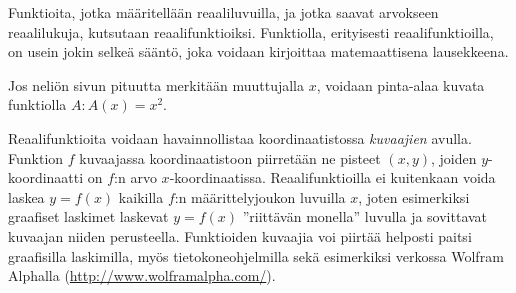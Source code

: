 Funktioita, jotka määritellään reaaliluvuilla, ja jotka saavat arvokseen reaalilukuja, kutsutaan reaalifunktioiksi.
Funktiolla, erityisesti reaalifunktioilla, on usein jokin selkeä sääntö, joka voidaan kirjoittaa matemaattisena lausekkeena.

\begin{esimerkki}
	Jos neliön sivun pituutta merkitään muuttujalla $x$, voidaan pinta-alaa kuvata funktiolla $A\colon A(x) = x^2$.
\end{esimerkki} 

Reaalifunktioita voidaan havainnollistaa koordinaatistossa \textit{kuvaajien} avulla.
Funktion $f$ kuvaajassa koordinaatistoon piirretään ne pisteet $(x, y)$, joiden $y$-koordinaatti on $f$:n arvo $x$-koordinaatissa.
Reaalifunktioilla ei kuitenkaan voida laskea $y = f(x)$ kaikilla $f$:n määrittelyjoukon luvuilla $x$, joten esimerkiksi graafiset laskimet
laskevat $y = f(x)$ ''riittävän monella'' luvulla ja sovittavat kuvaajan niiden perusteella.
Funktioiden kuvaajia voi piirtää helposti paitsi graafisilla laskimilla, myös tietokoneohjelmilla sekä esimerkiksi verkossa
Wolfram Alphalla (\url{http://www.wolframalpha.com/}). 

\def\vcent#1{\mathsurround0pt$\vcenter{\hbox{#1}}$}



